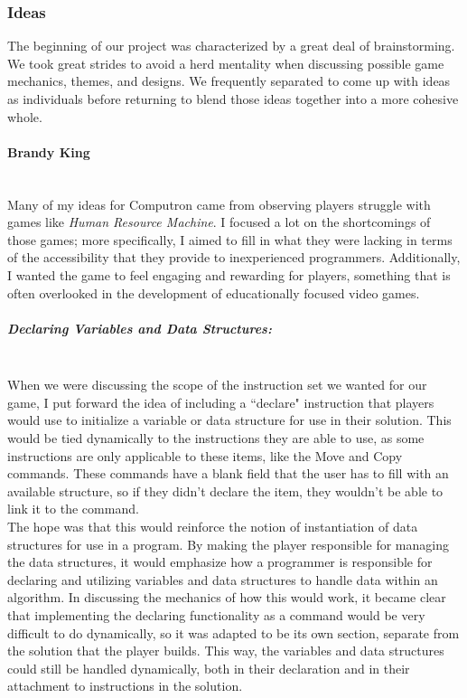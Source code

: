\subsubsection{Ideas}
The beginning of our project was characterized by a great deal of brainstorming. We took great strides
to avoid a herd mentality when discussing possible game mechanics, themes, and designs. We frequently
separated to come up with ideas as individuals before returning to blend those ideas together into a more
cohesive whole.

\paragraph{Brandy King}\mbox{} \\
Many of my ideas for Computron came from observing players struggle with games like \textit{Human
Resource Machine}. I focused a lot on the shortcomings of those games; more specifically, I aimed to fill in
what they were lacking in terms of the accessibility that they provide to inexperienced programmers. 
Additionally, I wanted the game to feel engaging and rewarding for players, something that is often 
overlooked in the development of educationally focused video games. \\

\subparagraph{Declaring Variables and Data Structures:}\mbox{} \\
When we were discussing the scope of the instruction set we wanted for our game, I put forward the idea
of including a ``declare" instruction that players would use to initialize a variable or data structure for use
in their solution. This would be tied dynamically to the instructions they are able to use, as some instructions
are only applicable to these items, like the Move and Copy commands. These commands have a blank field
that the user has to fill with an available structure, so if they didn't declare the item, they wouldn't be able to
link it to the command.\\

The hope was that this would reinforce the notion of instantiation of data structures for use in a program. By
making the player responsible for managing the data structures, it would emphasize how a programmer
is responsible for declaring and utilizing variables and data structures to handle data within an algorithm. In
discussing the mechanics of how this would work, it became clear that implementing the declaring functionality
as a command would be very difficult to do dynamically, so it was adapted to be its own section, separate from
the solution that the player builds. This way, the variables and data structures could still be handled dynamically,
both in their declaration and in their attachment to instructions in the solution.\\


